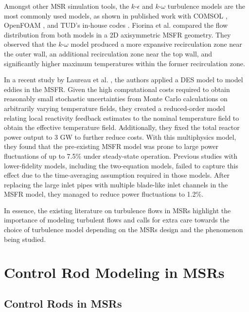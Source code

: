 Amongst other \gls{MSR} simulation tools, the $k$-$\epsilon$ and $k$-$\omega$
turbulence models are the most commonly used models, as shown in published work
with COMSOL \cite{fiorina_modelling_2014}, OpenFOAM
\cite{aufiero_development_2014}, and \gls{TUD}'s in-house codes
\cite{fiorina_modelling_2014,tiberga_results_2020}. Fiorina et al.
\cite{fiorina_modelling_2014} compared the flow distribution from both models
in a 2D axisymmetric \gls{MSFR} geometry. They observed that the $k$-$\omega$
model produced a more expansive recirculation zone near the outer wall, an additional
recirculation zone near the top wall, and significantly higher maximum
temperatures within the former recirculation zone.

In a recent study by
Laureau et al. \cite{laureau_unmoderated_2022}, the authors applied a \gls{DES} model to model
eddies in the \gls{MSFR}. Given the high computational costs required to obtain reasonably small
stochastic uncertainties from Monte Carlo calculations on arbitrarily varying temperature fields,
they created a reduced-order model relating local reactivity feedback estimates to the nominal
temperature field to obtain the effective temperature field.
Additionally, they fixed the total
reactor power output to 3 GW to further reduce costs. With this multiphysics model, they found
that the pre-existing \gls{MSFR} model was prone to large power fluctuations of up to 7.5\% under
steady-state operation. Previous studies with lower-fidelity models, including the two-equation
models, failed to capture this effect due to the time-averaging assumption required in those
models. After replacing the large inlet pipes with multiple blade-like inlet channels in the
\gls{MSFR} model, they managed to reduce power fluctuations to 1.2\%.

In essence, the existing literature on turbulence flows in \glspl{MSR} highlight
the importance of modeling turbulent flows and calls for extra care towards the choice of
turbulence model depending on the \glspl{MSR} design and the phenomenon being studied.

\section{Control Rod Modeling in MSRs}

\subsection{Control Rods in MSRs}

